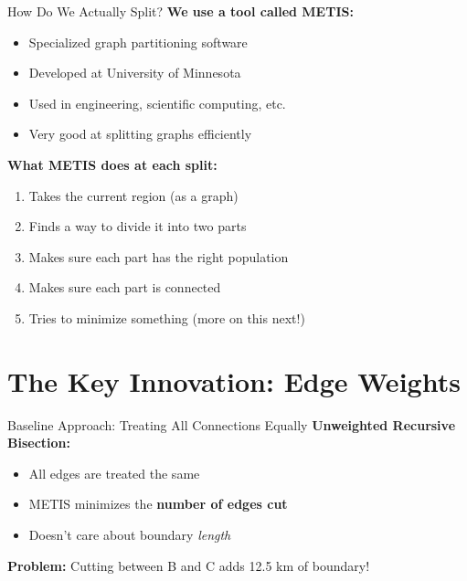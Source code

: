\documentclass[aspectratio=169]{beamer}
\begin{document}
\begin{frame}{How Do We Actually Split?}
\textbf{We use a tool called METIS:}
\begin{itemize}
\item Specialized graph partitioning software
\item Developed at University of Minnesota
\item Used in engineering, scientific computing, etc.
\item Very good at splitting graphs efficiently
\end{itemize}

\vspace{1em}
\textbf{What METIS does at each split:}
\begin{enumerate}
\item Takes the current region (as a graph)
\item Finds a way to divide it into two parts
\item Makes sure each part has the right population
\item Makes sure each part is connected
\item Tries to minimize something (more on this next!)
\end{enumerate}
\end{frame}

\section{The Key Innovation: Edge Weights}

\begin{frame}{Baseline Approach: Treating All Connections Equally}
\textbf{Unweighted Recursive Bisection:}
\begin{itemize}
\item All edges are treated the same
\item METIS minimizes the \textbf{number of edges cut}
\item Doesn't care about boundary \textit{length}
\end{itemize}

\vspace{1em}
\begin{center}
\end{center}

\textbf{Problem:} Cutting between B and C adds 12.5 km of boundary!
\end{frame}
\end{document}
